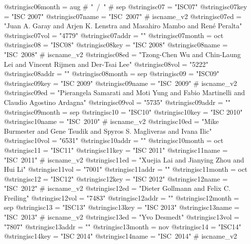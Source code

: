 @string{isc06month =            aug # "~/~" # sep}
@string{isc07 =                 "ISC07"}
@string{isc07key =              "ISC 2007"}
@string{isc07name =             "ISC~2007" # iscname_v2}
@string{isc07ed =               "Juan A. Garay and Arjen K. Lenstra and Masahiro Mambo and Ren{\'e} Peralta"}
@string{isc07vol =              "4779"}
@string{isc07addr =             ""}
@string{isc07month =            oct}
@string{isc08 =                 "ISC08"}
@string{isc08key =              "ISC 2008"}
@string{isc08name =             "ISC~2008" # iscname_v2}
@string{isc08ed =               "Tzong-Chen Wu and Chin-Laung Lei and Vincent Rijmen and Der-Tsai Lee"}
@string{isc08vol =              "5222"}
@string{isc08addr =             ""}
@string{isc08month =            sep}
@string{isc09 =                 "ISC09"}
@string{isc09key =              "ISC 2009"}
@string{isc09name =             "ISC~2009" # iscname_v2}
@string{isc09ed =               "Pierangela Samarati and Moti Yung and Fabio Martinelli and Claudio Agostino Ardagna"}
@string{isc09vol =              "5735"}
@string{isc09addr =             ""}
@string{isc09month =            sep}
@string{isc10 =                 "ISC10"}
@string{isc10key =              "ISC 2010"}
@string{isc10name =             "ISC~2010" # iscname_v2}
@string{isc10ed =               "Mike Burmester and Gene Tsudik and Spyros S. Magliveras and Ivana Ilic"}
@string{isc10vol =              "6531"}
@string{isc10addr =             ""}
@string{isc10month =            oct}
@string{isc11 =                 "ISC11"}
@string{isc11key =              "ISC 2011"}
@string{isc11name =             "ISC~2011" # iscname_v2}
@string{isc11ed =               "Xuejia Lai and Jianying Zhou and Hui Li"}
@string{isc11vol =              "7001"}
@string{isc11addr =             ""}
@string{isc11month =            oct}
@string{isc12 =                 "ISC12"}
@string{isc12key =              "ISC 2012"}
@string{isc12name =             "ISC~2012" # iscname_v2}
@string{isc12ed =               "Dieter Gollmann and Felix C. Freiling"}
@string{isc12vol =              "7483"}
@string{isc12addr =             ""}
@string{isc12month =            sep}
@string{isc13 =                 "ISC13"}
@string{isc13key =              "ISC 2013"}
@string{isc13name =             "ISC~2013" # iscname_v2}
@string{isc13ed =               "Yvo Desmedt"}
@string{isc13vol =              "7807"}
@string{isc13addr =             ""}
@string{isc13month =            nov}
@string{isc14 =                 "ISC14"}
@string{isc14key =              "ISC 2014"}
@string{isc14name =             "ISC~2014" # iscname_v2}
